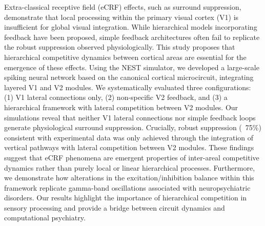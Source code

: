 Extra-classical receptive field (eCRF) effects, such as surround suppression, demonstrate that local processing within the primary visual cortex (V1) is insufficient for global visual integration. While hierarchical models incorporating feedback have been proposed, simple feedback architectures often fail to replicate the robust suppression observed physiologically. This study proposes that hierarchical competitive dynamics between cortical areas are essential for the emergence of these effects. Using the NEST simulator, we developed a large-scale spiking neural network based on the canonical cortical microcircuit, integrating layered V1 and V2 modules. We systematically evaluated three configurations: (1) V1 lateral connections only, (2) non-specific V2 feedback, and (3) a hierarchical framework with lateral competition between V2 modules. Our simulations reveal that neither V1 lateral connections nor simple feedback loops generate physiological surround suppression. Crucially, robust suppression (~75\%) consistent with experimental data was only achieved through the integration of vertical pathways with lateral competition between V2 modules. These findings suggest that eCRF phenomena are emergent properties of inter-areal competitive dynamics rather than purely local or linear hierarchical processes. Furthermore, we demonstrate how alterations in the excitation/inhibition balance within this framework replicate gamma-band oscillations associated with neuropsychiatric disorders. Our results highlight the importance of hierarchical competition in sensory processing and provide a bridge between circuit dynamics and computational psychiatry.

